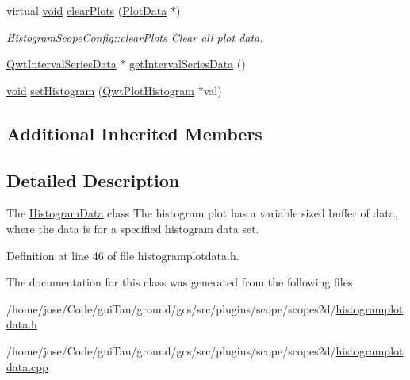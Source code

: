 \begin{DoxyCompactItemize}
virtual \hyperlink{group___u_a_v_objects_plugin_ga444cf2ff3f0ecbe028adce838d373f5c}{void} \hyperlink{group___scope_plugin_gaba86940fa8881f8a36b2bafacd9d59f6}{clear\-Plots} (\hyperlink{class_plot_data}{Plot\-Data} $\ast$)
\begin{DoxyCompactList}\small\item\em Histogram\-Scope\-Config\-::clear\-Plots Clear all plot data. \end{DoxyCompactList}\item 
\hyperlink{class_qwt_interval_series_data}{Qwt\-Interval\-Series\-Data} $\ast$ \hyperlink{group___scope_plugin_ga025ada984f64906121e98805e9ab43b4}{get\-Interval\-Series\-Data} ()
\item 
\hyperlink{group___u_a_v_objects_plugin_ga444cf2ff3f0ecbe028adce838d373f5c}{void} \hyperlink{group___scope_plugin_ga2f4dbd730d5616dbd15922f23f775d02}{set\-Histogram} (\hyperlink{class_qwt_plot_histogram}{Qwt\-Plot\-Histogram} $\ast$val)
\end{DoxyCompactItemize}
\subsection*{Additional Inherited Members}


\subsection{Detailed Description}
The \hyperlink{class_histogram_data}{Histogram\-Data} class The histogram plot has a variable sized buffer of data, where the data is for a specified histogram data set. 

Definition at line 46 of file histogramplotdata.\-h.



The documentation for this class was generated from the following files\-:\begin{DoxyCompactItemize}
\item 
/home/jose/\-Code/gui\-Tau/ground/gcs/src/plugins/scope/scopes2d/\hyperlink{histogramplotdata_8h}{histogramplotdata.\-h}\item 
/home/jose/\-Code/gui\-Tau/ground/gcs/src/plugins/scope/scopes2d/\hyperlink{histogramplotdata_8cpp}{histogramplotdata.\-cpp}\end{DoxyCompactItemize}
